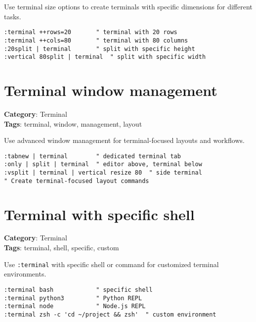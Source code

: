 {{{{{{{{{{Use terminal size options to create terminals with specific dimensions for different tasks.

\begin{Exa*}{}
\begin{Verbatim}[fontsize=\footnotesize, breaklines, breakanywhere]
:terminal ++rows=20       " terminal with 20 rows
:terminal ++cols=80       " terminal with 80 columns
:20split | terminal       " split with specific height
:vertical 80split | terminal  " split with specific width
\end{Verbatim}
\end{Exa*}

\section{Terminal window management}

\textbf{Category}: Terminal\\ \textbf{Tags}: terminal, window, management, layout
\vspace{0.5cm}

Use advanced window management for terminal-focused layouts and workflows.

\begin{Exa*}{}
\begin{Verbatim}[fontsize=\footnotesize, breaklines, breakanywhere]
:tabnew | terminal        " dedicated terminal tab
:only | split | terminal  " editor above, terminal below
:vsplit | terminal | vertical resize 80  " side terminal
" Create terminal-focused layout commands
\end{Verbatim}
\end{Exa*}

\section{Terminal with specific shell}

\textbf{Category}: Terminal\\ \textbf{Tags}: terminal, shell, specific, custom
\vspace{0.5cm}

Use {\footnotesize \Verb§:terminal§} with specific shell or command for customized terminal environments.

\begin{Exa*}{}
\begin{Verbatim}[fontsize=\footnotesize, breaklines, breakanywhere]
:terminal bash            " specific shell
:terminal python3         " Python REPL
:terminal node            " Node.js REPL
:terminal zsh -c 'cd ~/project && zsh'  " custom environment
\end{Verbatim}
\end{Exa*}

}}}}}}}}}}
